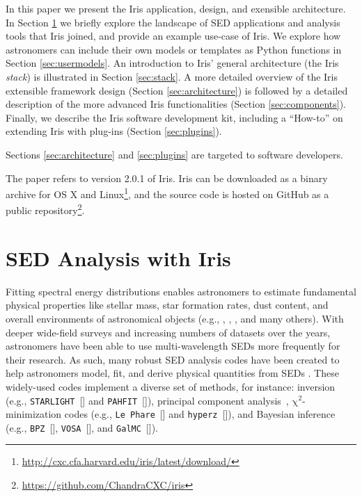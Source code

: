 \documentclass[final,5p,authoryear]{elsarticle}
\begin{document}
In this paper we present the Iris application, design, and exensible architecture. In Section
\ref{sec:overview} we briefly explore the landscape of SED applications and
analysis tools that Iris joined, and provide an example use-case of Iris. We
explore how astronomers can include their own models or templates as Python
functions in Section \ref{sec:usermodels}. An introduction to Iris' general
architecture (the Iris \emph{stack}) is illustrated in Section \ref{sec:stack}.
A more detailed overview of the Iris extensible framework design (Section
\ref{sec:architecture}) is followed by a detailed description of the more
advanced Iris functionalities (Section \ref{sec:components}). Finally, we
describe the Iris software development kit, including a ``How-to'' on extending
Iris with plug-ins (Section \ref{sec:plugins}).

Sections \ref{sec:architecture} and \ref{sec:plugins} are targeted to software
developers.

The paper refers to version 2.0.1 of Iris. Iris can be downloaded as a binary
archive for OS X and
Linux\footnote{\url{http://cxc.cfa.harvard.edu/iris/latest/download/}}, and the
source code is hosted on GitHub as a public
repository\footnote{\url{https://github.com/ChandraCXC/iris}}.

\section{SED Analysis with Iris} \label{sec:overview}

Fitting spectral energy distributions enables astron\-omers to estimate fundamental
physical properties like stellar mass, star formation rates, dust content, and
overall environments of astronomical objects (e.g., \citet{1998AJ....115.1329S},
\citet{2001ApJS..137..139S}, \citet{2007ApJS..169..328R}, and many others). With
deeper wide-field surveys and increasing numbers of datasets over the years,
astronomers have been able to use multi-wavelength SEDs more frequently for
their research. As such, many robust SED analysis codes have been created to
help astronomers mod\-el, fit, and derive physical quantities from SEDs
\citep{2011Ap&SS.331....1W,2013ARA&A..51..393C}. These widely-used codes
implement a diverse set of methods, for instance: inversion (e.g., 
\verb|STARLIGHT|~[\citealp{2004MNRAS.355..273C}] and
\verb|PAHFIT|~[\citealp{2007ApJ...656..770S}]),
principal component analysis~\citep[e.g.,][]{2009MNRAS.394.1496B},
$\mathrm{\chi}^{2}$-minimization codes 
(e.g., \verb|Le Phare|~[\citealp{1999MNRAS.310..540A}] and 
\verb|hyperz|~[\citealp{2000A&A...363..476B}]), and Bayesian inference 
(e.g., \verb|BPZ|~[\citealp{2000ApJ...536..571B}], 
\verb|VOSA|~[\citealp{2008A&A...492..277B}], and 
\verb|GalMC|~[\citealp{2011ApJ...737...47A}]).
\end{document}
